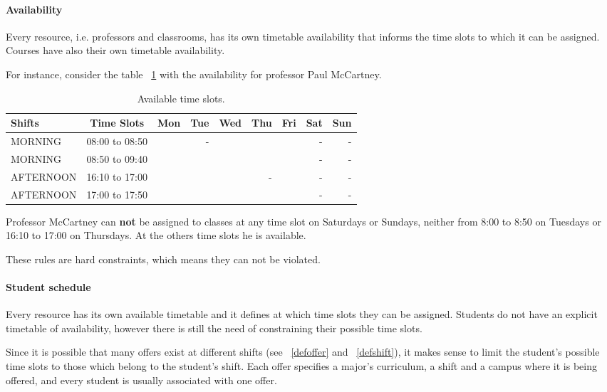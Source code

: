 \paragraph{Availability}
\label{constravailab}

Every resource, i.e. professors and classrooms, has its own timetable availability that informs the time slots to which it can be assigned. Courses have also their own timetable availability.

For instance, consider the table ~\ref{tab:availabMT} with the availability for professor Paul McCartney.

\begin{table}[H]
\centering
\begin{tabular}{l|c|r|r|r|r|r|r|r}
Shifts & Time Slots & Mon & Tue & Wed & Thu & Fri & Sat & Sun \\\hline
MORNING & 08:00 to 08:50 & & - & & & & - & - \\
MORNING & 08:50 to 09:40 & & & & & & - & - \\
AFTERNOON & 16:10 to 17:00 & & & & - & & - & - \\
AFTERNOON & 17:00 to 17:50 & & & & & & - & -
\end{tabular}
\caption{\label{tab:availabMT}Available time slots.}
\end{table}

Professor McCartney can \textbf{not} be assigned to classes at any time slot on Saturdays or Sundays, neither from 8:00 to 8:50 on Tuesdays or 16:10 to 17:00 on Thursdays. At the others time slots he is available.

These rules are hard constraints, which means they can not be violated.


\paragraph{Student schedule}
\label{constrstudentsched}

Every resource has its own available timetable and it defines at which time slots they can be assigned. Students do not have an explicit timetable of availability, however there is still the need of constraining their possible time slots.

Since it is possible that many offers exist at different shifts (see ~\ref{defoffer} and ~\ref{defshift}), it makes sense to limit the student's possible time slots to those which belong to the student's shift. Each offer specifies a major's curriculum, a shift and a campus where it is being offered, and every student is usually associated with one offer.

